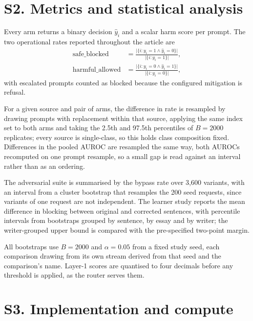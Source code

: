 \documentclass[journal]{IEEEtran}
\begin{document}
\section*{S2. Metrics and statistical analysis}

Every arm returns a binary decision $\hat{y}_i$ and a scalar harm score per
prompt. The two operational rates reported throughout the article are
\begin{align}
\mathrm{safe\_blocked}   &= \frac{\bigl|\{i: y_i{=}1 \wedge \hat{y}_i{=}0\}\bigr|}
                                 {\bigl|\{i: y_i{=}1\}\bigr|}, \label{eq:sb}\\[2pt]
\mathrm{harmful\_allowed} &= \frac{\bigl|\{i: y_i{=}0 \wedge \hat{y}_i{=}1\}\bigr|}
                                 {\bigl|\{i: y_i{=}0\}\bigr|}, \label{eq:ha}
\end{align}
with escalated prompts counted as blocked because the configured mitigation is
refusal.

For a given source and pair of arms, the difference in rate is resampled by
drawing prompts with replacement within that source, applying the same index
set to both arms and taking the 2.5th and 97.5th percentiles of $B=2000$
replicates; every source is single-class, so this holds class composition
fixed. Differences in the pooled AUROC are resampled the same way, both AUROCs
recomputed on one prompt resample, so a small gap is read against an interval
rather than as an ordering.

The adversarial suite is summarised by the bypass rate over 3{,}600 variants,
with an interval from a cluster bootstrap that resamples the 200 seed requests,
since variants of one request are not independent. The learner study reports
the mean difference in blocking between original and corrected sentences, with
percentile intervals from bootstraps grouped by sentence, by essay and by
writer; the writer-grouped upper bound is compared with the pre-specified
two-point margin.

All bootstraps use $B=2000$ and $\alpha=0.05$ from a fixed study seed, each
comparison drawing from its own stream derived from that seed and the
comparison's name. Layer-1 scores are quantised to four decimals before any
threshold is applied, as the router serves them.

\section*{S3. Implementation and compute}
\end{document}

